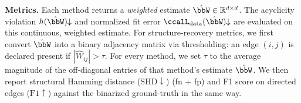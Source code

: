 \documentclass[conference]{IEEEtran}
\newcommand{\Ldata}{\ccalL_{\mathrm{data}}}
\begin{document}
    \vspace{1mm}
	\noindent\textbf{Metrics.}
    Each method returns a \emph{weighted} estimate $\hat{\bbW}\in\mathbb{R}^{d\times d}$.
    The acyclicity violation $h(\hat{\bbW}){\downarrow}$ and normalized fit error
    $\Ldata(\hat{\bbW}){\downarrow}$ are evaluated on this continuous,
    weighted estimate. 
    For structure-recovery metrics, we first convert $\hat{\bbW}$ into a binary
    adjacency matrix via thresholding: %
    an edge $(i,j)$ is
    declared present if $|\hat{W}_{ij}|>\tau$. For every method, we set $\tau$
    to the average magnitude of the off-diagonal entries of that method's
    estimate $\hat{\bbW}$.
    We then report structural Hamming distance ($\mathrm{SHD}{\downarrow}$) (fn + fp) and F1
    score on directed edges ($\mathrm{F1}{\uparrow}$) against the binarized
    ground-truth in the same way.
\end{document}
